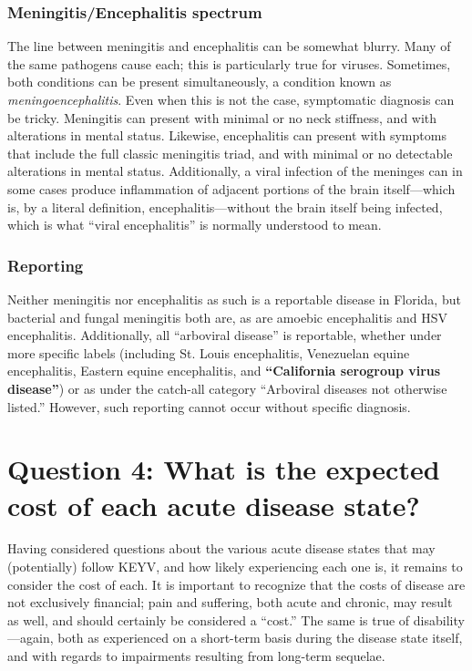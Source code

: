 \documentclass[12pt]{article}
\newcommand{\eg}{\textit{e.g.}}
\newcommand{\cjh}{\textcolor{blue}{cjh}}
\newcommand{\tjh}{\textcolor{red}{tjh}}
\newcommand{\msg}[3]{(#1 $\rightarrow$ #2: #3)}
\newcommand{\mct}[1]{\msg\cjh\tjh{#1}}
\begin{document}
        \subsubsection{Meningitis/Encephalitis spectrum}
            \label{spectrum}
            The line between meningitis and encephalitis can be somewhat blurry. Many of the same pathogens cause each; this is particularly true for viruses. Sometimes, both conditions can be present simultaneously, a condition known as \textit{meningoencephalitis}. Even when this is not the case, symptomatic diagnosis can be tricky. Meningitis can present with minimal or no neck stiffness, and with alterations in mental status. Likewise, encephalitis can present with symptoms that include the full classic meningitis triad, and with minimal or no detectable alterations in mental status. Additionally, a viral infection of the meninges can in some cases produce inflammation of adjacent portions of the brain itself---which is, by a literal definition, encephalitis---without the brain itself being infected, which is what ``viral encephalitis'' is normally understood to mean\cite{ropper2014adams}.
        
        \subsubsection{Reporting}
            \label{reporting}
            Neither meningitis nor encephalitis as such is a reportable disease in Florida, but bacterial and fungal meningitis both are, as are amoebic encephalitis and HSV encephalitis. Additionally, all ``arboviral disease'' is reportable, whether under more specific labels (including St. Louis encephalitis, Venezuelan equine encephalitis, Eastern equine encephalitis, and \textbf{``California serogroup virus disease''}) or as under the catch-all category ``Arboviral diseases not otherwise listed.''\cite{florida2016reportable} However, such reporting cannot occur without specific diagnosis.


    \section[Expected costs, given diseases]{Question 4: What is the expected cost of each acute disease state?}
        \label{costs}
        Having considered questions about the various acute disease states that may (potentially) follow KEYV, and how likely experiencing each one is, it remains to consider the cost of each. It is important to recognize that the costs of disease are not exclusively financial; pain and suffering, both acute and chronic, may result as well, and should certainly be considered a ``cost.'' The same is true of disability---again, both as experienced on a short-term basis during the disease state itself, and with regards to impairments resulting from long-term sequelae.
\end{document}
